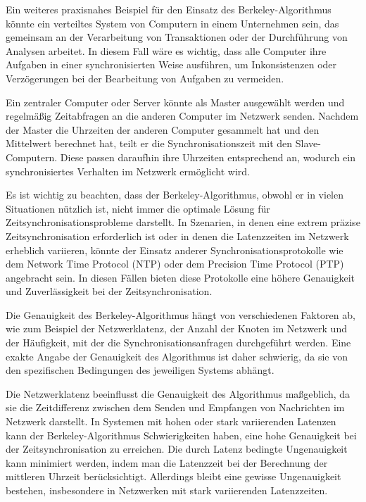Ein weiteres praxisnahes Beispiel für den Einsatz des Berkeley-Algorithmus könnte ein verteiltes System von Computern in einem Unternehmen sein, das gemeinsam an der Verarbeitung von Transaktionen oder der Durchführung von Analysen arbeitet. In diesem Fall wäre es wichtig, dass alle Computer ihre Aufgaben in einer synchronisierten Weise ausführen, um Inkonsistenzen oder Verzögerungen bei der Bearbeitung von Aufgaben zu vermeiden.

Ein zentraler Computer oder Server könnte als Master ausgewählt werden und regelmäßig Zeitabfragen an die anderen Computer im Netzwerk senden. Nachdem der Master die Uhrzeiten der anderen Computer gesammelt hat und den Mittelwert berechnet hat, teilt er die Synchronisationszeit mit den Slave-Computern. Diese passen daraufhin ihre Uhrzeiten entsprechend an, wodurch ein synchronisiertes Verhalten im Netzwerk ermöglicht wird.

Es ist wichtig zu beachten, dass der Berkeley-Algorithmus, obwohl er in vielen Situationen nützlich ist, nicht immer die optimale Lösung für Zeitsynchronisationsprobleme darstellt. In Szenarien, in denen eine extrem präzise Zeitsynchronisation erforderlich ist oder in denen die Latenzzeiten im Netzwerk erheblich variieren, könnte der Einsatz anderer Synchronisationsprotokolle wie dem Network Time Protocol (NTP) oder dem Precision Time Protocol (PTP) angebracht sein. In diesen Fällen bieten diese Protokolle eine höhere Genauigkeit und Zuverlässigkeit bei der Zeitsynchronisation.

Die Genauigkeit des Berkeley-Algorithmus hängt von verschiedenen Faktoren ab, wie zum Beispiel der Netzwerklatenz, der Anzahl der Knoten im Netzwerk und der Häufigkeit, mit der die Synchronisationsanfragen durchgeführt werden. Eine exakte Angabe der Genauigkeit des Algorithmus ist daher schwierig, da sie von den spezifischen Bedingungen des jeweiligen Systems abhängt.

Die Netzwerklatenz beeinflusst die Genauigkeit des Algorithmus maßgeblich, da sie die Zeitdifferenz zwischen dem Senden und Empfangen von Nachrichten im Netzwerk darstellt. In Systemen mit hohen oder stark variierenden Latenzen kann der Berkeley-Algorithmus Schwierigkeiten haben, eine hohe Genauigkeit bei der Zeitsynchronisation zu erreichen. Die durch Latenz bedingte Ungenauigkeit kann minimiert werden, indem man die Latenzzeit bei der Berechnung der mittleren Uhrzeit berücksichtigt. Allerdings bleibt eine gewisse Ungenauigkeit bestehen, insbesondere in Netzwerken mit stark variierenden Latenzzeiten.

